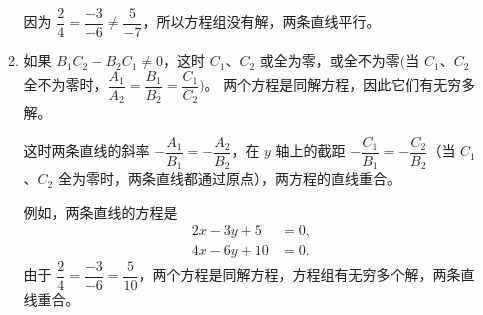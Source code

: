 \begin{enumerate}
\begin{enumerate}
    因为 $\dfrac{2}{4} = \dfrac{-3}{-6} \neq \dfrac{5}{-7}$，所以方程组没有解，两条直线平行。
    \item 如果 $B_1C_2-B_2C_1\neq 0$，这时 $C_1$、$C_2$ 或全为零，或全不为零$\biggl($当 $C_1$、$C_2$ 全不为零时，$\dfrac{A_1}{A_2}= \dfrac{B_1}{B_2}=\dfrac{C_1}{C_2}\biggr)$。
    两个方程是同解方程，因此它们有无穷多解。

    \medskip 这时两条直线的斜率 $-\dfrac{A_1}{B_1}=-\dfrac{A_2}{B_2}$，在 $y$ 轴上的截距 $-\dfrac{C_1}{B_1}=-\dfrac{C_2}{B_2}$（当 $C_1$、$C_2$ 全为零时，两条直线都通过原点），两方程的直线重合。

例如，两条直线的方程是
\begin{align*}
  2x-3y+5 & = 0,\\
  4x-6y+10 & = 0.
\end{align*}
由于 $\dfrac{2}{4} = \dfrac{-3}{-6} = \dfrac{5}{10}$，两个方程是同解方程，方程组有无穷多个解，两条直线重合。
  \end{enumerate}
\end{enumerate}

